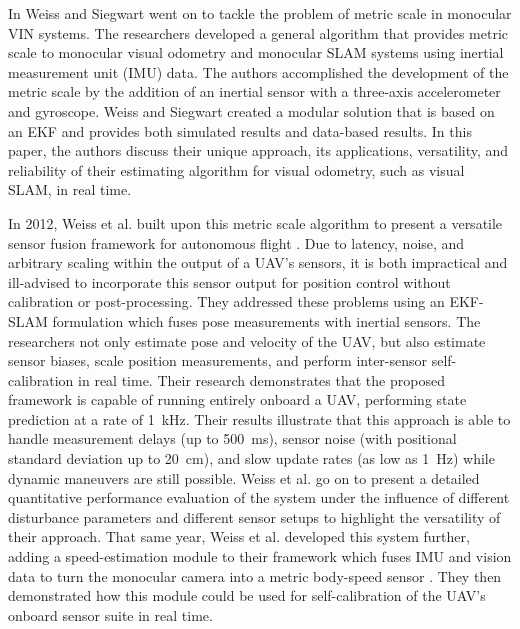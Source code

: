 In \cite{Weiss2011_2} Weiss and Siegwart went on to tackle the problem of metric scale in monocular VIN systems. The researchers developed a general algorithm that provides metric scale to monocular visual odometry and monocular SLAM systems using inertial measurement unit (IMU) data. The authors accomplished the development of the metric scale by the addition of an inertial sensor with a three-axis accelerometer and gyroscope. Weiss and Siegwart created a modular solution that is based on an EKF and provides both simulated results and data-based results. In this paper, the authors discuss their unique approach, its applications, versatility, and reliability of their estimating algorithm for visual odometry, such as visual SLAM, in real time. 

In 2012, Weiss et al. built upon this metric scale algorithm to present a versatile sensor fusion framework for autonomous flight \cite{Weiss2012}. Due to latency, noise, and arbitrary scaling within the output of a UAV's sensors, it is both impractical and ill-advised to incorporate this sensor output for position control without calibration or post-processing. They addressed these problems using an EKF-SLAM formulation which fuses pose measurements with inertial sensors. The researchers not only estimate pose and velocity of the UAV, but also estimate sensor biases, scale position measurements, and perform inter-sensor self-calibration in real time. Their research demonstrates that the proposed framework is capable of running entirely onboard a UAV, performing state prediction at a rate of 1~kHz. Their results illustrate that this approach is able to handle measurement delays (up to 500~ms), sensor noise (with positional standard deviation up to 20~cm), and slow update rates (as low as 1~Hz) while dynamic maneuvers are still possible. Weiss et al. go on to present a detailed quantitative performance evaluation of the system under the influence of different disturbance parameters and different sensor setups to highlight the versatility of their approach. That same year, Weiss et al. developed this system further, adding a speed-estimation module to their framework which fuses IMU and vision data to turn the monocular camera into a metric body-speed sensor \cite{Weiss2012_2}. They then demonstrated how this module could be used for self-calibration of the UAV's onboard sensor suite in real time.

